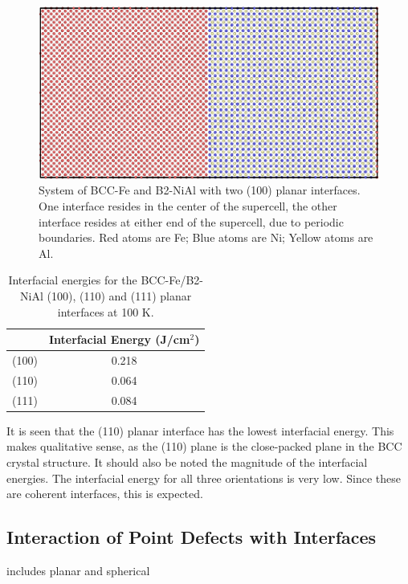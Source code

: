\documentclass[review]{elsarticle}
\begin{document}
\begin{figure}[hp]
   \centering
   \includegraphics[width=\textwidth]{figure_nf.png} 
   \caption{System of BCC-Fe and B2-NiAl with two (100) planar interfaces.  One interface resides in the center of the supercell, the other interface resides at either end of the supercell, due to periodic boundaries.  Red atoms are Fe; Blue atoms are Ni; Yellow atoms are Al.}
   \label{fig:example}
\end{figure}

\begin{table}[htbp]
\caption{Interfacial energies for the BCC-Fe/B2-NiAl (100), (110) and (111) planar interfaces at 100 K.}
\begin{center}
\begin{tabular}{|c|c|}
	\hline
	& Interfacial Energy (J/cm$^{2}$)  \\
	 \hline
	 (100) & 0.218  \\
	 (110) & 0.064  \\
	 (111) & 0.084  \\
	  	 \hline
\end{tabular}
\end{center}
\label{default}
\end{table}%

It is seen that the (110) planar interface has the lowest interfacial energy.  This makes qualitative sense, as the (110) plane is the close-packed plane in the BCC crystal structure.  It should also be noted the magnitude of the interfacial energies.  The interfacial energy for all three orientations is very low.  Since these are coherent interfaces, this is expected.  

\subsection{Interaction of Point Defects with Interfaces}
includes planar and spherical
\end{document}
